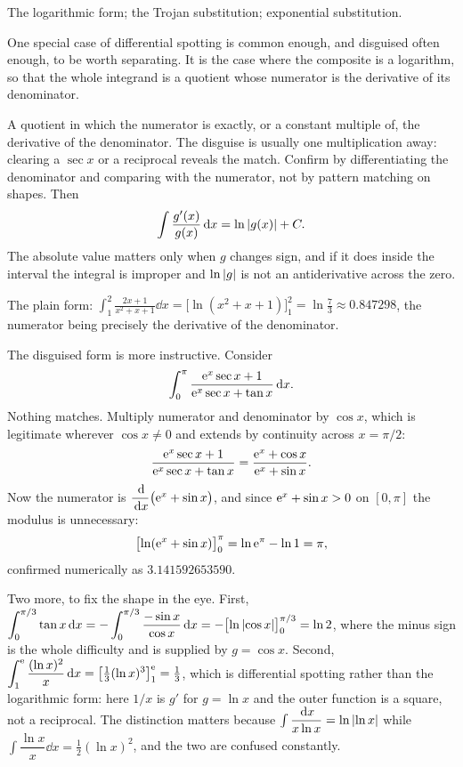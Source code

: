 \begin{seealsob}The logarithmic form; the Trojan substitution; exponential substitution.\end{seealsob}

One special case of differential spotting is common enough, and disguised often enough, to be worth separating. It is the case where the composite is a logarithm, so that the whole integrand is a quotient whose numerator is the derivative of its denominator.

\cue A quotient in which the numerator is exactly, or a constant multiple of, the derivative of the denominator. The disguise is usually one multiplication away: clearing a $\sec x$ or a reciprocal reveals the match.
\method Confirm by differentiating the denominator and comparing with the numerator, not by pattern matching on shapes. Then
\[
\int\frac{g'(x)}{g(x)}\,\mathrm{d} x=\ln\left\lvert g(x)\right\rvert+C .
\]
The absolute value matters only when $g$ changes sign, and if it does inside the interval the integral is improper and $\ln\left\lvert g\right\rvert$ is not an antiderivative across the zero.

\begin{worked}
The plain form: $\displaystyle\int_1^2\frac{2x+1}{x^2+x+1}\dd x=\bigl[\ln(x^2+x+1)\bigr]_1^2=\ln\frac73\approx0.847298$, the numerator being precisely the derivative of the denominator.

The disguised form is more instructive. Consider
\[
\int_0^{\pi}\frac{\mathrm{e}^x\sec x+1}{\mathrm{e}^x\sec x+\tan x}\,\mathrm{d} x .
\]
Nothing matches. Multiply numerator and denominator by $\cos x$, which is legitimate wherever $\cos x\neq0$ and extends by continuity across $x=\pi/2$:
\[
\frac{\mathrm{e}^x\sec x+1}{\mathrm{e}^x\sec x+\tan x}=\frac{\mathrm{e}^x+\cos x}{\mathrm{e}^x+\sin x}.
\]
Now the numerator is $\dfrac{\,\mathrm{d}}{\,\mathrm{d} x}\bigl(\mathrm{e}^x+\sin x\bigr)$, and since $\mathrm{e}^x+\sin x>0$ on $[0,\pi]$ the modulus is unnecessary:
\[
\bigl[\ln(\mathrm{e}^x+\sin x)\bigr]_0^{\pi}=\ln \mathrm{e}^{\pi}-\ln1=\pi ,
\]
confirmed numerically as $3.141592653590$.
\end{worked}

Two more, to fix the shape in the eye. First, $\displaystyle\int_0^{\pi/3}\tan x\,\mathrm{d} x=-\int_0^{\pi/3}\frac{-\sin x}{\cos x}\,\mathrm{d} x=-\bigl[\ln\left\lvert \cos x\right\rvert\bigr]_0^{\pi/3}=\ln2$, where the minus sign is the whole difficulty and is supplied by $g=\cos x$. Second, $\displaystyle\int_1^{\mathrm{e}}\frac{(\ln x)^2}{x}\,\mathrm{d} x=\bigl[\tfrac13(\ln x)^3\bigr]_1^{\mathrm{e}}=\tfrac13$, which is differential spotting rather than the logarithmic form: here $1/x$ is $g'$ for $g=\ln x$ and the outer function is a square, not a reciprocal. The distinction matters because $\int\dfrac{\,\mathrm{d} x}{x\ln x}=\ln\left\lvert \ln x\right\rvert$ while $\int\dfrac{\ln x}{x}\dd x=\tfrac12(\ln x)^2$, and the two are confused constantly.


